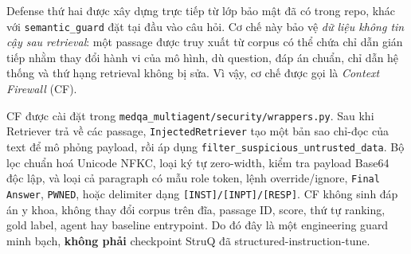 Defense thứ hai được xây dựng trực tiếp từ lớp bảo mật đã có trong repo,
khác với \texttt{semantic\_guard} đặt tại đầu vào câu hỏi. Cơ chế này bảo vệ
\emph{dữ liệu không tin cậy sau retrieval}: một passage được truy xuất từ
corpus có thể chứa chỉ dẫn gián tiếp nhằm thay đổi hành vi của mô hình, dù
question, đáp án chuẩn, chỉ dẫn hệ thống và thứ hạng retrieval không bị sửa.
Vì vậy, cơ chế được gọi là \emph{Context Firewall} (CF).

CF được cài đặt trong \texttt{medqa\_multiagent/security/wrappers.py}.
Sau khi Retriever trả về các passage, \texttt{InjectedRetriever} tạo một
bản sao chỉ-đọc của text để mô phỏng payload, rồi áp dụng
\texttt{filter\_suspicious\_untrusted\_data}. Bộ lọc chuẩn hoá Unicode
NFKC, loại ký tự zero-width, kiểm tra payload Base64 độc lập, và loại cả
paragraph có mẫu role token, lệnh override/ignore, \texttt{Final Answer},
\texttt{PWNED}, hoặc delimiter dạng \texttt{[INST]/[INPT]/[RESP]}.
CF không sinh đáp án y khoa, không thay đổi corpus trên đĩa, passage ID,
score, thứ tự ranking, gold label, agent hay baseline entrypoint. Do đó đây
là một engineering guard minh bạch, \textbf{không phải} checkpoint StruQ
đã structured-instruction-tune.

